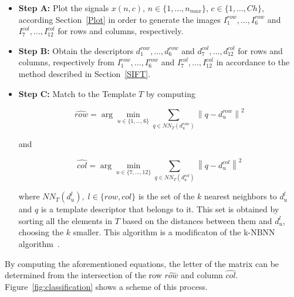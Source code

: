 \documentclass[utf8]{frontiersSCNS} %
\begin{document}
\begin{itemize}

\item \textbf{Step A:}\label{paso4} Plot the signals $x(n,c)$,  $n \in \{1, \dots, n_{max}\}$, $c \in \{1,\dots,Ch\}$,  according Section~\ref{Plot} in order to generate the images $I^{row}_1, \dots, I^{row}_6$ and $I^{col}_7,\dots,I^{col}_{12}$ for rows and columns, respectively. 

\item \textbf{Step B:} Obtain the descriptors $ d^{row}_1, \dots,  d^{row}_6 $  and  $ d^{col}_7, \dots,  d^{col}_{12} $ for rows and columns, respectively from $I^{row}_1, \dots, I^{row}_6$ and $I^{col}_7,\dots,I^{col}_{12}$  in accordance to the method described in Section~\ref{SIFT}. 

\item \textbf{Step C:} Match to the Template $T$ by computing  

\begin{equation}
\hat{row} = \arg \min_{u \in \{1,\dots,6\}} \sum_{q \in NN_T(d^{row}_u)}^{} \left\lVert q -  d^{row}_u \right\rVert ^2
\label{eq:multiclassificationrow}
\end{equation}

\noindent and

\begin{equation}
\hat{col} = \arg \min_{u \in \{7,\dots,12\}} \sum_{q \in NN_T(d^{col}_u)}^{} \left\lVert q -  d^{col}_u \right\rVert ^2
\label{eq:multiclassificationcol}
\end{equation}

where $NN_T(d^l_u),\;l\in\{row,{col}\}$  is the set of the $k$ nearest neighbors to $d^l_u$ and $q$ is a template descriptor that belongs to it.  This set is obtained by sorting all the elements in $T$ based on the distances between them and $d^l_u$, choosing the $k$ smaller. This algorithm is a modificaton of the k-NBNN  algorithm~\citep{Boiman2008}.

\end{itemize}
By computing the aforementioned equations, the letter of the matrix can be determined from the intersection of the row $ \hat{row} $ and column $ \hat{col} $. 
Figure~\ref{fig:classification} shows a scheme of this process. 


\end{document}
